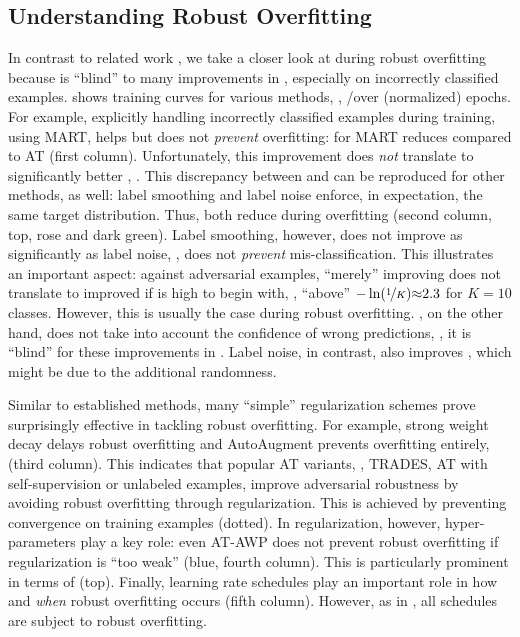 \subsection{Understanding Robust Overfitting}
\label{subsec:experiments-overfitting}

In contrast to related work \cite{RiceICML2020}, we take a closer look at \RCE during robust overfitting because \RTE is ``blind'' to many improvements in \RCE, especially on incorrectly classified examples.  shows training curves for various methods, \ie, \RCE/\RTE over (normalized) epochs. For example, explicitly handling incorrectly classified examples during training, using MART, helps but does not \emph{prevent} overfitting: \RCE for {\color{plot2}MART} reduces compared to {\color{plot1}AT} (first column). Unfortunately, this improvement does \emph{not} translate to significantly better \RTE, \cf {}. This discrepancy between \RCE and \RTE can be reproduced for other methods, as well: label smoothing and label noise enforce, in expectation, the same target distribution. Thus, both reduce \RCE during overfitting (second column, top, {\color{plot2}rose} and {\color{plot4}dark green}). Label smoothing, however, does not improve \RTE as significantly as label noise, \ie, does not \emph{prevent} mis-classification. This illustrates an important aspect: against adversarial examples, ``merely'' improving \RCE does not translate to improved \RTE if \RCE is high to begin with, \ie, ``above'' $-\ln(\nicefrac{1}{K}){\approx}2.3$ for $K{=}10$ classes. However, this is usually the case during robust overfitting. \RTE, on the other hand, does not take into account the confidence of wrong predictions, \ie, it is ``blind'' for these improvements in \RCE. Label noise, in contrast, also improves \RTE, which might be due to the additional randomness.

Similar to established methods, many ``simple'' regularization schemes prove surprisingly effective in tackling robust overfitting. For example, strong {\color{plot1}weight decay} delays robust overfitting and {\color{plot4}AutoAugment} prevents overfitting entirely, \cf {} (third column). This indicates that popular AT variants, \eg, {\color{plot6}TRADES}, AT with {\color{plot2}self-supervision} or {\color{plot5}unlabeled} examples, improve adversarial robustness by avoiding robust overfitting through regularization. This is achieved by preventing convergence on training examples (dotted).
In regularization, however, hyper-parameters play a key role: even AT-AWP does not prevent robust overfitting if regularization is ``too weak'' ({\color{plot1}blue}, fourth column). This is particularly  prominent in terms of \RCE (top). Finally, learning rate schedules play an important role in how and \emph{when} robust overfitting occurs (fifth column). However, as in \cite{RiceICML2020}, all schedules are subject to robust overfitting.

